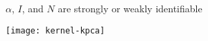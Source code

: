 \begin{frame}{$\alpha$, $I$, and $N$ are strongly or weakly identifiable}
  \centerline{\texttt{[image: kernel-kpca]}}
\end{frame}
